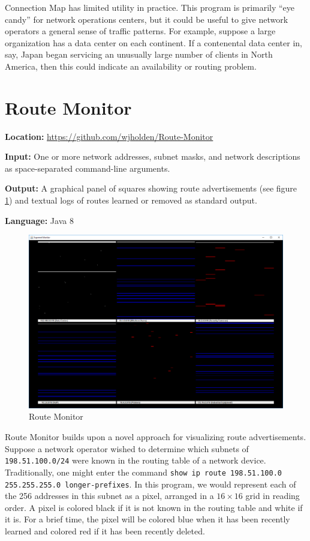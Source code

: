 \documentclass[12pt]{article}
\begin{document}
Connection Map has limited utility in practice. This program is primarily ``eye candy'' for network operations centers, but it could be useful to give network operators a general sense of traffic patterns. For example, suppose a large organization has a data center on each continent. If a contenental data center in, say, Japan began servicing an unusually large number of clients in North America, then this could indicate an availability or routing problem.

\section{Route Monitor}

\noindent \textbf{Location:} \url{https://github.com/wjholden/Route-Monitor}

\noindent \textbf{Input:} One or more network addresses, subnet masks, and network descriptions as space-separated command-line arguments.

\noindent \textbf{Output:} A graphical panel of squares showing route advertisements (see figure \ref{fig:Route-Monitor-1}) and textual logs of routes learned or removed as standard output.

\noindent \textbf{Language:} Java 8

\begin{figure}[h]
\centering
\includegraphics[width=.80\textwidth]{Route-Monitor-1}
\caption{Route Monitor}
\label{fig:Route-Monitor-1}
\end{figure}

Route Monitor builds upon a novel approach for visualizing route advertisements. Suppose a network operator wished to determine which subnets of \texttt{198.51.100.0/24} were known in the routing table of a network device. Traditionally, one might enter the command \texttt{show ip route 198.51.100.0 255.255.255.0 longer-prefixes}. In this program, we would represent each of the 256 addresses in this subnet as a pixel, arranged in a $16 \times 16$ grid in reading order. A pixel is colored black if it is not known in the routing table and white if it is. For a brief time, the pixel will be colored blue when it has been recently learned and colored red if it has been recently deleted.
\end{document}
